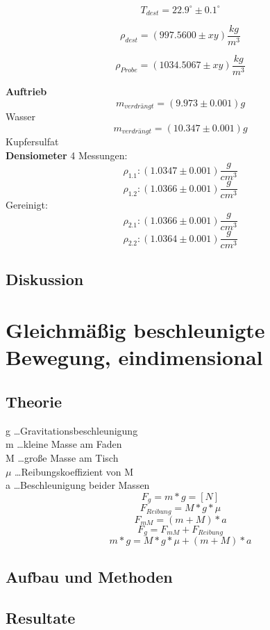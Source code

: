 \documentclass[12pt,a4paper]{article}
\begin{document}
\begin{multicols}{2}
$$T_{dest} = 22.9^\circ \pm 0.1^\circ$$

$$\rho_{dest} = (997.5600 \pm xy) \frac{kg}{m^3}$$

$$\rho_{Probe} = (1034.5067 \pm xy) \frac{kg}{m^3}$$

\textbf{Auftrieb}
$$m_{verdrängt} = (9.973 \pm 0.001)g$$ Wasser\\
$$m_{verdrängt} = (10.347 \pm 0.001)g$$ Kupfersulfat\\

\textbf{Densiometer}
4 Messungen:
$$\rho_{1.1}:   (1.0347 \pm 0.001) \frac{g}{cm^3}$$
$$\rho_{1.2}:   (1.0366 \pm 0.001) \frac{g}{cm^3}$$
Gereinigt:
$$\rho_{2.1}:   (1.0366 \pm 0.001) \frac{g}{cm^3}$$
$$\rho_{2.2}:   (1.0364 \pm 0.001) \frac{g}{cm^3}$$
\subsection{Diskussion}



\section{Gleichmäßig beschleunigte Bewegung, eindimensional}

\subsection{Theorie}

g \ldots Gravitationsbeschleunigung\\
m \ldots kleine Masse am Faden\\
M \ldots große Masse am Tisch\\
$\mu$ \ldots Reibungskoeffizient von M\\
a \ldots Beschleunigung beider Massen\\

$$F_g = m * g = [N]$$
$$F_{Reibung} = M*g*\mu$$
$$F_{mM} = (m+M)*a$$
$$F_{g} = F_{mM} + F_{Reibung}$$
$$m * g = M*g*\mu + (m+M)*a$$

\subsection{Aufbau und Methoden}

\subsection{Resultate}


\end{multicols}
\end{document}
